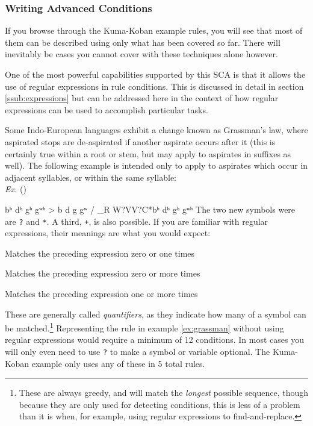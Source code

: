 \documentclass[10pt,letterpaper]{article}
\newcounter{excounter}
\newenvironment{vex}[1]{
	\refstepcounter{excounter}
	\noindent\emph{Ex.} (\arabic{excounter}\label{#1})
	\verbatim
}{\endverbatim}
\begin{document}

\subsubsection{Writing Advanced Conditions} 
\label{sec:writing_advanced_conditions}
If you browse through the Kuma-Koban example rules, you will see that most of them can be described using only what has been covered so far. There will inevitably be cases you cannot cover with these techniques alone however.

One of the most powerful capabilities supported by this SCA is that it allows the use of regular expressions in rule conditions. This is discussed in detail in section \ref{ssub:expressions} but can be addressed here in the context of how regular expressions can be used to accomplish particular tasks.

Some Indo-European languages exhibit a change known as Grassman's law, where aspirated stops are de-aspirated if another aspirate occurs after it (this is certainly true within a root or stem, but may apply to aspirates in suffixes as well). The following example is intended only to apply to aspirates which occur in adjacent syllables, or within the same syllable:\\

\begin{vex}{ex:grassman}
bʰ dʰ gʰ gʷʰ > b  d  g  gʷ / _{R W}?VV?C*{bʰ dʰ gʰ gʷʰ}
\end{vex}
\noindent
The two new symbols were are \texttt{?} and \texttt{*}. A third, \texttt{+}, is also possible. If you are familiar with regular expressions, their meanings are what you would expect:
\begin{description}
\itemsep1pt \parskip0pt  
\item[\texttt{?}] Matches the preceding expression zero or one times
\item[\texttt{*}] Matches the preceding expression zero or more times
\item[\texttt{+}] Matches the preceding expression one or more times
\end{description}
\noindent
These are generally called \emph{quantifiers}, as they indicate how many of a symbol can be matched.\footnote{These are always greedy, and will match the \emph{longest} possible sequence, though because they are only used for detecting conditions, this is less of a problem than it is when, for example, using regular expressions to find-and-replace.} Representing the rule in example \ref{ex:grassman} without using regular expressions would require a minimum of 12 conditions. In most cases you will only even need to use \texttt{?} to make a symbol or variable optional. The Kuma-Koban example only uses any of these in 5 total rules.
\end{document}
